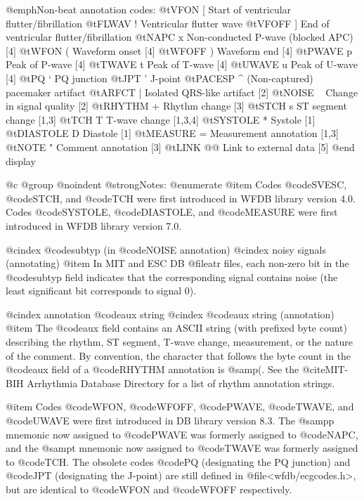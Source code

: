 {{{{{{{{{{@emph{Non-beat annotation codes:}
@t{VFON     [  } Start of ventricular flutter/fibrillation
@t{FLWAV    !  } Ventricular flutter wave
@t{VFOFF    ]  } End of ventricular flutter/fibrillation
@t{NAPC     x  } Non-conducted P-wave (blocked APC) [4]
@t{WFON     (  } Waveform onset [4]
@t{WFOFF    )  } Waveform end [4]
@t{PWAVE    p  } Peak of P-wave [4]
@t{TWAVE    t  } Peak of T-wave [4]
@t{UWAVE    u  } Peak of U-wave [4]
@t{PQ       `  } PQ junction
@t{JPT      '  } J-point
@t{PACESP   ^  } (Non-captured) pacemaker artifact
@t{ARFCT    |  } Isolated QRS-like artifact [2]
@t{NOISE    ~  } Change in signal quality [2]
@t{RHYTHM   +  } Rhythm change [3]
@t{STCH     s  } ST segment change [1,3]
@t{TCH      T  } T-wave change [1,3,4]
@t{SYSTOLE  *  } Systole [1]
@t{DIASTOLE D  } Diastole [1]
@t{MEASURE  =  } Measurement annotation [1,3]
@t{NOTE     "  } Comment annotation [3]
@t{LINK     @@  } Link to external data [5]
@end display

@c @group
@noindent
@strong{Notes:}
@enumerate
@item
Codes @code{SVESC}, @code{STCH}, and @code{TCH} were first introduced
in WFDB library version 4.0.  Codes @code{SYSTOLE}, @code{DIASTOLE}, and
@code{MEASURE} were first introduced in WFDB library version 7.0.

@cindex @code{subtyp} (in @code{NOISE} annotation)
@cindex noisy signals (annotating)
@item
In MIT and ESC DB @file{atr} files, each non-zero bit in the @code{subtyp}
field indicates that the corresponding signal contains noise (the least
significant bit corresponds to signal 0).

@cindex annotation @code{aux} string
@cindex @code{aux} string (annotation)
@item
The @code{aux} field contains an ASCII string (with prefixed byte count)
describing the rhythm, ST segment, T-wave change, measurement, or the
nature of the comment.  By convention, the character that follows the
byte count in the @code{aux} field of a @code{RHYTHM} annotation is @samp{(}.
See the @cite{MIT-BIH Arrhythmia Database Directory} for a list of rhythm
annotation strings.

@item
Codes @code{WFON}, @code{WFOFF}, @code{PWAVE}, @code{TWAVE}, and
@code{UWAVE} were first introduced in DB library version 8.3.  The
@samp{p} mnemonic now assigned to @code{PWAVE} was formerly assigned to
@code{NAPC}, and the @samp{t} mnemonic now assigned to @code{TWAVE} was
formerly assigned to @code{TCH}.  The obsolete codes @code{PQ}
(designating the PQ junction) and @code{JPT} (designating the J-point)
are still defined in @file{<wfdb/ecgcodes.h>}, but are identical to
@code{WFON} and @code{WFOFF} respectively.

}}}}}}}}}}
